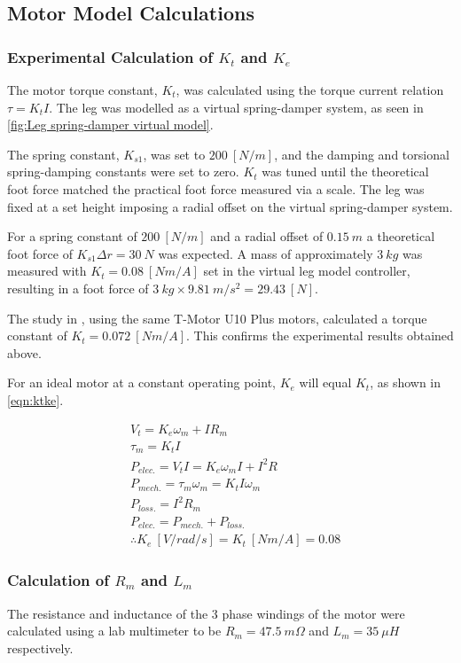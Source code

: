 \subsection{Motor Model Calculations}

\subsubsection{Experimental Calculation of $K_t$ and $K_e$}
The motor torque constant, $K_t$, was calculated using the torque current relation $\tau = K_tI$. The leg was modelled as a virtual spring-damper system, as seen in \cref{fig:Leg spring-damper virtual model}. 

The spring constant, $K_{s1}$, was set to $200\ [N/m]$, and the damping and torsional spring-damping constants were set to zero. $K_t$ was tuned until the theoretical foot force matched the practical foot force measured via a scale. The leg was fixed at a set height imposing a radial offset on the virtual spring-damper system.

For a spring constant of $200\ [N/m]$ and a radial offset of $0.15\ m$ a theoretical foot force of $K_{s1}\Delta r = 30\ N$ was expected. A mass of approximately $3\ kg$ was measured with $K_t = 0.08\ [Nm/A]$ set in the virtual leg model controller, resulting in a foot force of $3\ kg \times 9.81\ m/s^2 = 29.43\ [N]$. 

The study in \cite{Kalouche2016}, using the same T-Motor U10 Plus motors, calculated a torque constant of $K_t =  0.072\ [Nm/A]$. This confirms the experimental results obtained above.

For an ideal motor at a constant operating point, $K_e$ will equal $K_t$, as shown in \cref{eqn:ktke}.

\begin{equation} \label{eqn:ktke}
\begin{aligned}
&V_t = K_e\omega_m + IR_m \\
&\tau_m = K_t I \\
&P_{elec.} = V_t I = K_e \omega_m I + I^2 R \\ 
&P_{mech.} = \tau_m \omega_m = K_t I \omega_m \\
&P_{loss.} = I^2 R_m \\
&P_{elec.} = P_{mech.} + P_{loss.} \\
&\therefore K_e\ [V/rad/s]= K_t\ [Nm/A] = 0.08
\end{aligned} 
\end{equation}

\subsubsection{Calculation of $R_m$ and $L_m$}
The resistance and inductance of the 3 phase windings of the motor were calculated using a lab multimeter to be $R_m = 47.5\ m\Omega$ and $L_m = 35\ \mu H$ respectively. 

